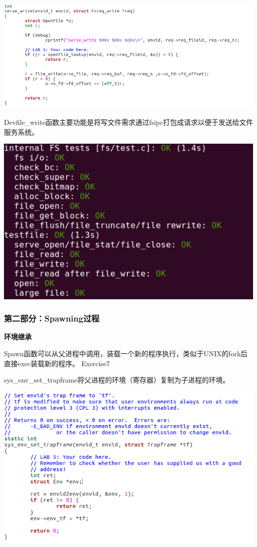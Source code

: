 \begin{ExerciseList}

  \includegraphics[width=6in]{figures/lab5/image83.png}

  Devfile\_write函数主要功能是将写文件需求通过fsipc打包成请求以便于发送给文件服务系统。

  \includegraphics[width=6in]{figures/lab5/image84.png}

  \subsubsection{第二部分：Spawning过程}

  \textbf{环境继承}

  Spawn函数可以从父进程中调用，装载一个新的程序执行，类似于UNIX的fork后直接exec装载新的程序。
  Exercise7

  sys\_env\_set\_trapframe将父进程的环境（寄存器）复制为子进程的环境。

  \includegraphics[width=6in]{figures/lab5/image86.png}


\end{ExerciseList}
